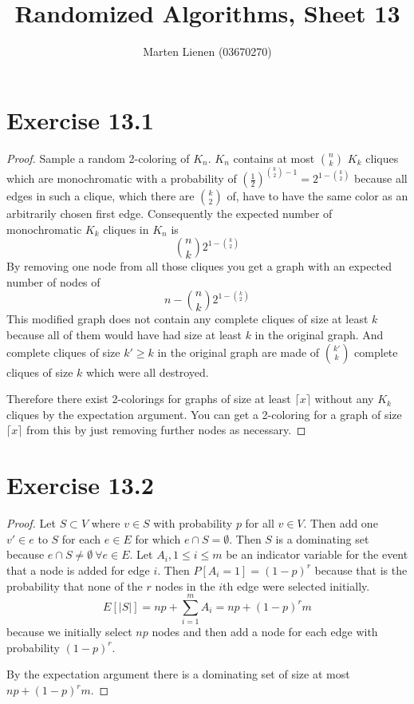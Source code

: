 \documentclass[10pt,a4paper]{article}
\title{Randomized Algorithms, Sheet 13}
\author{Marten Lienen (03670270)}
\begin{document}
\maketitle

\section*{Exercise 13.1}

\begin{proof}
  Sample a random 2-coloring of $K_{n}$.
  $K_{n}$ contains at most $\binom{n}{k}$ $K_{k}$ cliques which are monochromatic with a probability of $\left( \frac{1}{2} \right)^{\binom{k}{2} - 1} = 2^{1 - \binom{k}{2}}$ because all edges in such a clique, which there are $\binom{k}{2}$ of, have to have the same color as an arbitrarily chosen first edge.
  Consequently the expected number of monochromatic $K_{k}$ cliques in $K_{n}$ is
  \begin{equation*}
    \binom{n}{k} 2^{1 - \binom{k}{2}}
  \end{equation*}
  By removing one node from all those cliques you get a graph with an expected number of nodes of
  \begin{equation*}
    n - \binom{n}{k} 2^{1 - \binom{k}{2}}
  \end{equation*}
  This modified graph does not contain any complete cliques of size at least $k$ because all of them would have had size at least $k$ in the original graph.
  And complete cliques of size $k' \ge k$ in the original graph are made of $\binom{k'}{k}$ complete cliques of size $k$ which were all destroyed.

  Therefore there exist 2-colorings for graphs of size at least $\lceil x \rceil$  without any $K_{k}$ cliques by the expectation argument.
  You can get a 2-coloring for a graph of size $\lceil x \rceil$ from this by just removing further nodes as necessary.
\end{proof}

\section*{Exercise 13.2}

\begin{proof}
  Let $S \subset V$ where $v \in S$ with probability $p$ for all $v \in V$.
  Then add one $v' \in e$ to $S$ for each $e \in E$ for which $e \cap S = \emptyset$.
  Then $S$ is a dominating set because $e \cap S \ne \emptyset\ \forall e \in E$.
  Let $A_{i}, 1 \le i \le m$ be an indicator variable for the event that a node is added for edge $i$.
  Then $P[A_{i} = 1] = (1 - p)^{r}$ because that is the probability that none of the $r$ nodes in the $i$th edge were selected initially.
  \begin{equation*}
    E[|S|] = np + \sum_{i = 1}^{m} A_{i} = np + (1 - p)^{r}m
  \end{equation*}
  because we initially select $np$ nodes and then add a node for each edge with probability $(1 - p)^{r}$.

  By the expectation argument there is a dominating set of size at most $np + (1 - p)^{r}m$.
\end{proof}
\end{document}
